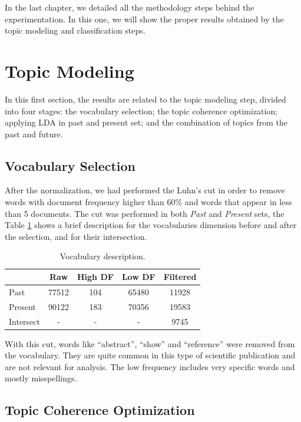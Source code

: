 In the last chapter, we detailed all the methodology steps behind the experimentation. In this one, we will show the proper results obtained by the topic modeling and classification steps.

\section{Topic Modeling}

In this first section, the results are related to the topic modeling step, divided into four stages: the vocabulary selection; the topic coherence optimization; applying LDA in past and present set; and the combination of topics from the past and future.

\subsection{Vocabulary Selection}

After the normalization, we had performed the Luhn's cut in order to remove words with document frequency higher than 60\% and words that appear in less than 5 documents. The cut was performed in both \textit{Past} and \textit{Present} sets, the Table \ref{tab:vocabulary} shows a brief description for the vocabularies dimension before and after the selection, and for their intersection.

\begin{table}[h!]
	\centering
	\caption{Vocabulary description.}
	\label{tab:vocabulary}
	\begin{tabular}{l|cccc}
		\toprule
		          &  \textbf{Raw}  & \textbf{High DF} & \textbf{Low DF} & \textbf{Filtered} \\ \midrule
		Past      & 77512 &   104   & 65480  &  11928   \\
		Present   & 90122 &   183   & 70356  &  19583   \\
		Intersect &   -   &    -    &   -    &   9745   \\ \bottomrule
	\end{tabular}
\end{table}

With this cut, words like ``abstract'', ``show'' and ``reference'' were removed from the vocabulary. They are quite common in this type of scientific publication and are not relevant for analysis. The low frequency includes very specific words and mostly misspellings.

\subsection{Topic Coherence Optimization}

